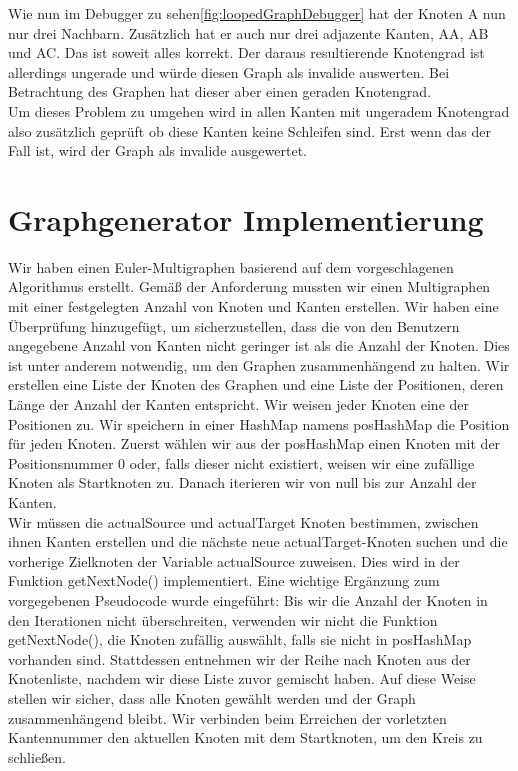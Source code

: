 Wie nun im Debugger zu sehen\ref{fig:loopedGraphDebugger} hat der Knoten A nun nur drei Nachbarn. Zusätzlich hat er auch nur drei adjazente Kanten, AA, AB und AC. Das ist soweit alles korrekt. Der daraus resultierende Knotengrad ist allerdings ungerade und würde diesen Graph als invalide auswerten. Bei Betrachtung des Graphen hat dieser aber einen geraden Knotengrad.\\
Um dieses Problem zu umgehen wird in allen Kanten mit ungeradem Knotengrad also zusätzlich geprüft ob diese Kanten keine Schleifen sind. Erst wenn das der Fall ist, wird der Graph als invalide ausgewertet.

\section{Graphgenerator Implementierung}
Wir haben einen Euler-Multigraphen basierend auf dem vorgeschlagenen Algorithmus erstellt. Gemäß der Anforderung mussten wir einen Multigraphen mit einer festgelegten Anzahl von Knoten und Kanten erstellen. Wir haben eine Überprüfung hinzugefügt, um sicherzustellen, dass die von den Benutzern angegebene Anzahl von Kanten nicht geringer ist als die Anzahl der Knoten. Dies ist unter anderem notwendig, um den Graphen zusammenhängend zu halten. Wir erstellen eine Liste der Knoten des Graphen und eine Liste der Positionen, deren Länge der Anzahl der Kanten entspricht. Wir weisen jeder Knoten eine der Positionen zu. 
Wir speichern in einer HashMap namens posHashMap die Position für jeden Knoten. Zuerst wählen wir aus der posHashMap einen Knoten mit der Positionsnummer 0 oder, falls dieser nicht existiert, weisen wir eine zufällige Knoten als Startknoten zu. Danach iterieren wir von null bis zur Anzahl der Kanten.\\
Wir müssen die actualSource und actualTarget Knoten bestimmen, zwischen ihnen Kanten erstellen und die nächste neue actualTarget-Knoten suchen und die vorherige Zielknoten der Variable actualSource zuweisen. Dies wird in der Funktion getNextNode() implementiert. Eine wichtige Ergänzung zum vorgegebenen Pseudocode wurde eingeführt: Bis wir die Anzahl der Knoten in den Iterationen nicht überschreiten, verwenden wir nicht die Funktion getNextNode(), die Knoten zufällig auswählt, falls sie nicht in posHashMap vorhanden sind. Stattdessen entnehmen wir der Reihe nach Knoten aus der Knotenliste, nachdem wir diese Liste zuvor gemischt haben. Auf diese Weise stellen wir sicher, dass alle Knoten gewählt werden und der Graph zusammenhängend bleibt. Wir verbinden beim Erreichen der vorletzten Kantennummer den aktuellen Knoten mit dem Startknoten, um den Kreis zu schließen.\\

